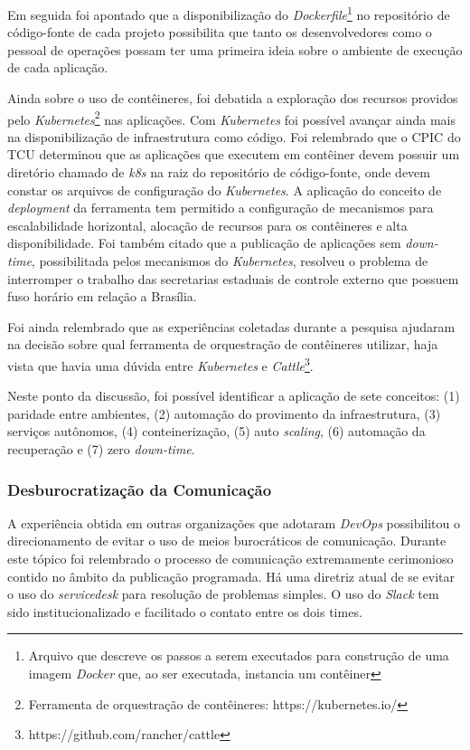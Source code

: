 Em seguida foi apontado que a disponibilização do {\it Dockerfile}\footnote{Arquivo
que descreve os passos a serem executados para construção de uma imagem
{\it Docker} que, ao ser executada, instancia um contêiner} no repositório de
código-fonte de cada projeto possibilita que tanto os desenvolvedores como o
pessoal de operações possam ter uma primeira ideia sobre o ambiente de execução
de cada aplicação.

Ainda sobre o uso de contêineres, foi debatida a exploração dos recursos providos
pelo {\it Kubernetes}\footnote{Ferramenta de orquestração de contêineres: https://kubernetes.io/}
nas aplicações. Com {\it Kubernetes} foi possível avançar ainda mais na
disponibilização de infraestrutura como código. Foi relembrado que o \acrfull{CPIC}
do \acrshort{TCU} determinou que as aplicações que executem em contêiner devem
possuir um diretório chamado de \emph{k8s} na raiz do repositório de código-fonte,
onde devem constar os arquivos de configuração do {\it Kubernetes}.
A aplicação do conceito de {\it deployment} da ferramenta tem permitido a
configuração de mecanismos para escalabilidade horizontal, alocação de recursos
para os contêineres e alta disponibilidade. Foi também citado que a
publicação de aplicações sem {\it down-time}, possibilitada pelos mecanismos do
{\it Kubernetes}, resolveu o problema de interromper o trabalho das secretarias
estaduais de controle externo que possuem fuso horário em relação a Brasília.

Foi ainda relembrado que as experiências coletadas durante a pesquisa ajudaram
na decisão sobre qual ferramenta de orquestração de contêineres utilizar,
haja vista que havia uma dúvida entre {\it Kubernetes} e \emph{Cattle}\footnote{https://github.com/rancher/cattle}.

Neste ponto da discussão, foi possível identificar a aplicação de sete
conceitos: (1) paridade entre ambientes, (2) automação do provimento da
infraestrutura, (3) serviços autônomos, (4) conteinerização, (5) auto {\it scaling},
(6) automação da recuperação e (7) zero {\it down-time}.

\subsubsection{Desburocratização da Comunicação}

A experiência obtida em outras organizações que adotaram {\it DevOps}
possibilitou o direcionamento de evitar o uso de meios burocráticos de
comunicação. Durante este tópico foi relembrado o processo de comunicação
extremamente cerimonioso contido no âmbito da publicação programada. Há uma
diretriz atual de se evitar o uso do {\it servicedesk} para resolução de
problemas simples. O uso do {\it Slack} tem sido institucionalizado e facilitado
o contato entre os dois times.

